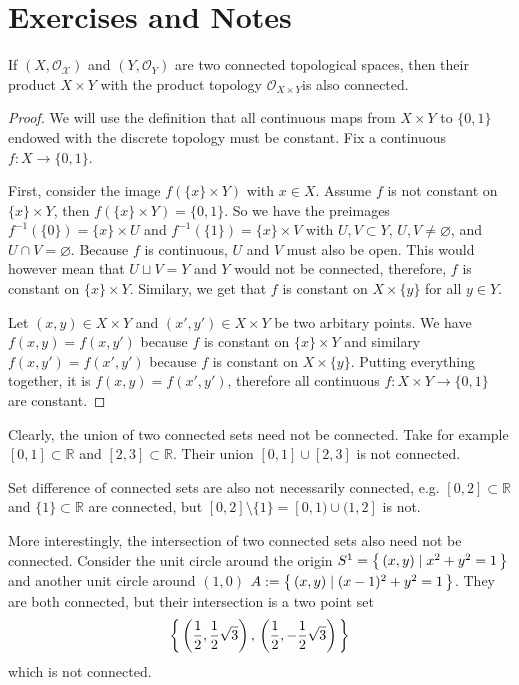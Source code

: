 \section{Exercises and Notes}
\begin{remark}
If \((X, \mathcal{O_X})\) and \((Y, \mathcal{O}_Y)\) are two connected topological spaces, then their product \(X \times Y\) with the product topology \(\mathcal{O}_{X \times Y}\)is also connected.
\end{remark}
\begin{proof}
    We will use the definition that all continuous maps from \(X \times Y\) to \(\{0, 1\}\) endowed with the discrete topology must be constant. Fix a continuous \(f: X \longrightarrow \{0, 1\}\).
    
    First, consider the image \(f(\{x\} \times Y)\) with \(x \in X\). Assume \(f\) is not constant on \(\{x\} \times Y\), then \(f(\{x\} \times Y) = \{0, 1\}\). So we have the preimages \(f^{-1}(\{0\}) = \{x\} \times U\) and \(f^{-1}(\{1\}) = \{x\} \times V\) with \(U, V \subset Y\), \(U, V \neq \varnothing\), and \(U \cap V = \varnothing\). Because \(f\) is continuous, \(U\) and \(V\) must also be open. This would however mean that \(U \sqcup V = Y\) and \(Y\) would not be connected, therefore, \(f\) is constant on \(\{x\} \times Y\). Similary, we get that \(f\) is constant on \(X \times \{y\}\) for all \(y \in Y\).

    Let \((x, y) \in X \times Y\) and \((x', y') \in X \times Y\) be two arbitary points. We have \(f(x, y) = f(x, y')\) because \(f\) is constant on \(\{x\} \times Y\) and similary \(f(x, y') = f(x', y')\) because \(f\) is constant on \(X \times \{y\}\). Putting everything together, it is \(f(x, y) = f(x',y')\), therefore all continuous \(f: X \times Y \longrightarrow \{0, 1\}\) are constant.
\end{proof}

\begin{example}
    Clearly, the union of two connected sets need not be connected. Take for example \([0, 1] \subset \mathbb{R}\) and \([2, 3] \subset \mathbb{R}\). Their union \([0, 1] \cup [2, 3]\) is not connected.

    Set difference of connected sets are also not necessarily connected, e.g. \([0, 2] \subset \mathbb{R}\) and \(\{1\} \subset \mathbb{R}\) are connected, but \([0, 2] \setminus \{1\} = [0, 1) \cup (1, 2]\) is not.

    More interestingly, the intersection of two connected sets also need not be connected. Consider the unit circle around the origin \(S^1 = \left\{\, (x, y) \mid x^2 + y^2 = 1 \,\right\}\) and another unit circle around \((1, 0)\) \(A := \left\{\, (x, y) \mid (x-1)^2 + y^2 = 1 \,\right\}\). They are both connected, but their intersection is a two point set
    \begin{equation*}
        \left\{\, \left(\frac{1}{2}, \frac{1}{2}\sqrt{3}\right),\, \left(\frac{1}{2}, -\frac{1}{2}\sqrt{3}\right) \,\right\}
    \end{equation*}
    which is not connected.
\end{example}

